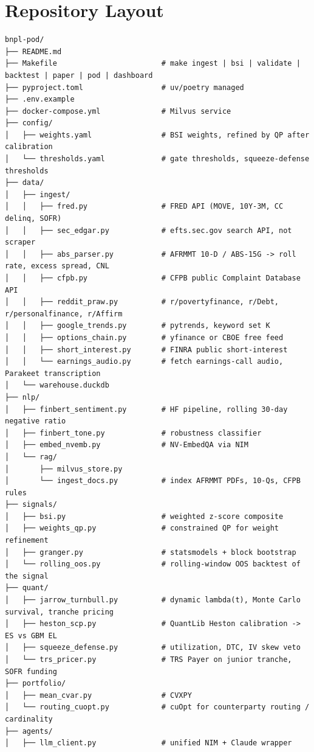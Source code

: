 \documentclass[11pt]{article}
\begin{document}
\section{Repository Layout}

\begin{lstlisting}
bnpl-pod/
├── README.md
├── Makefile                        # make ingest | bsi | validate | backtest | paper | pod | dashboard
├── pyproject.toml                  # uv/poetry managed
├── .env.example
├── docker-compose.yml              # Milvus service
├── config/
│   ├── weights.yaml                # BSI weights, refined by QP after calibration
│   └── thresholds.yaml             # gate thresholds, squeeze-defense thresholds
├── data/
│   ├── ingest/
│   │   ├── fred.py                 # FRED API (MOVE, 10Y-3M, CC delinq, SOFR)
│   │   ├── sec_edgar.py            # efts.sec.gov search API, not scraper
│   │   ├── abs_parser.py           # AFRMMT 10-D / ABS-15G -> roll rate, excess spread, CNL
│   │   ├── cfpb.py                 # CFPB public Complaint Database API
│   │   ├── reddit_praw.py          # r/povertyfinance, r/Debt, r/personalfinance, r/Affirm
│   │   ├── google_trends.py        # pytrends, keyword set K
│   │   ├── options_chain.py        # yfinance or CBOE free feed
│   │   ├── short_interest.py       # FINRA public short-interest
│   │   └── earnings_audio.py       # fetch earnings-call audio, Parakeet transcription
│   └── warehouse.duckdb
├── nlp/
│   ├── finbert_sentiment.py        # HF pipeline, rolling 30-day negative ratio
│   ├── finbert_tone.py             # robustness classifier
│   ├── embed_nvemb.py              # NV-EmbedQA via NIM
│   └── rag/
│       ├── milvus_store.py
│       └── ingest_docs.py          # index AFRMMT PDFs, 10-Qs, CFPB rules
├── signals/
│   ├── bsi.py                      # weighted z-score composite
│   ├── weights_qp.py               # constrained QP for weight refinement
│   ├── granger.py                  # statsmodels + block bootstrap
│   └── rolling_oos.py              # rolling-window OOS backtest of the signal
├── quant/
│   ├── jarrow_turnbull.py          # dynamic lambda(t), Monte Carlo survival, tranche pricing
│   ├── heston_scp.py               # QuantLib Heston calibration -> ES vs GBM EL
│   ├── squeeze_defense.py          # utilization, DTC, IV skew veto
│   └── trs_pricer.py               # TRS Payer on junior tranche, SOFR funding
├── portfolio/
│   ├── mean_cvar.py                # CVXPY
│   └── routing_cuopt.py            # cuOpt for counterparty routing / cardinality
├── agents/
│   ├── llm_client.py               # unified NIM + Claude wrapper

\end{lstlisting}
\end{document}
